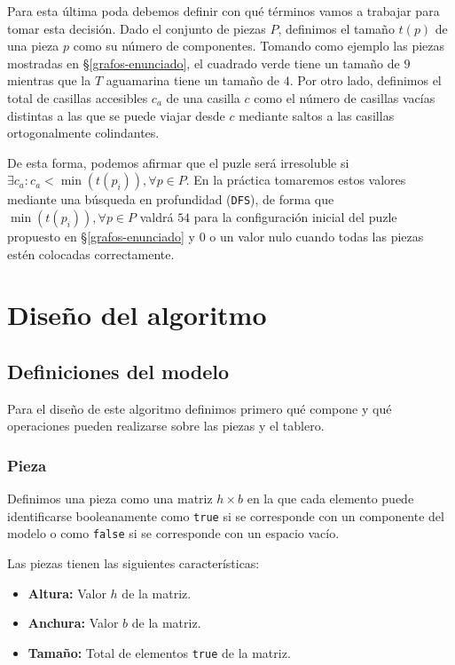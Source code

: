 Para esta última poda debemos definir con qué términos vamos a trabajar para tomar esta decisión.
Dado el conjunto de piezas $P$, definimos el tamaño $t(p)$ de una pieza $p$ como su número de componentes.
Tomando como ejemplo las piezas mostradas en \S\ref{grafos-enunciado}, el cuadrado verde tiene un tamaño de $9$ mientras que la $T$ aguamarina tiene un tamaño de $4$.
Por otro lado, definimos el total de casillas accesibles $c_a$ de una casilla $c$ como el número de casillas vacías distintas a las que se puede viajar desde $c$ mediante saltos a las casillas ortogonalmente colindantes.

De esta forma, podemos afirmar que el puzle será irresoluble si $\exists c_a:c_a<\min(t(p_i)),\forall p\in P$.
En la práctica tomaremos estos valores mediante una búsqueda en profundidad (\texttt{DFS}), de forma que $\min(t(p_i)),\forall p\in P$ valdrá $54$ para la configuración inicial del puzle propuesto en \S\ref{grafos-enunciado} y $0$ o un valor nulo cuando todas las piezas estén colocadas correctamente.

\section{Diseño del algoritmo}\label{grafos-algoritmo}

\subsection{Definiciones del modelo}\label{grafos-algoritmo-definiciones}

Para el diseño de este algoritmo definimos primero qué compone y qué operaciones pueden realizarse sobre las piezas y el tablero.

\subsubsection{Pieza}\label{grafos-algoritmo-definiciones-pieza}

Definimos una pieza como una matriz $h\times b$ en la que cada elemento puede identificarse booleanamente como \texttt{true} si se corresponde con un componente del modelo o como \texttt{false} si se corresponde con un espacio vacío.

Las piezas tienen las siguientes características:

\begin{itemize}
	\item\textbf{Altura:} Valor $h$ de la matriz.
	\item\textbf{Anchura:} Valor $b$ de la matriz.
	\item\textbf{Tamaño:} Total de elementos \texttt{true} de la matriz.
\end{itemize}

